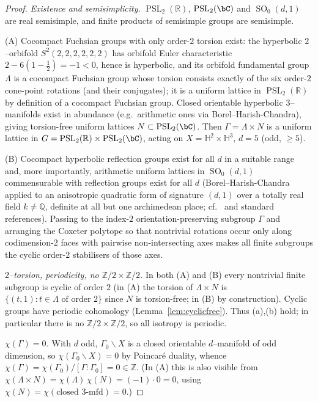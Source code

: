 \documentclass[12pt]{article}
\newcommand{\bR}{\mathbb{R}}
\newcommand{\bQ}{\mathbb{Q}}
\newcommand{\bZ}{\mathbb{Z}}
\newcommand{\bH}{\mathbb{H}}
\DeclareMathOperator{\SO}{SO}
\DeclareMathOperator{\PSL}{PSL}
\theoremstyle{definition}
\begin{document}
\begin{proof}
\emph{Existence and semisimplicity.}  $\PSL_2(\bR)$, $\PSL_2(\bC)$ and
$\SO_0(d,1)$ are real semisimple, and finite products of semisimple groups are
semisimple.

(A) Cocompact Fuchsian groups with only order-$2$ torsion exist: the hyperbolic
$2$--orbifold $S^2(2,2,2,2,2,2)$ has orbifold Euler characteristic
$2-6(1-\tfrac12)=-1<0$, hence is hyperbolic, and its orbifold fundamental group
$\Lambda$ is a cocompact Fuchsian group whose torsion consists exactly of the six
order-$2$ cone-point rotations (and their conjugates); it is a uniform lattice in
$\PSL_2(\bR)$ by definition of a cocompact Fuchsian group.  Closed orientable
hyperbolic $3$--manifolds exist in abundance (e.g.\ arithmetic ones via
Borel--Harish-Chandra), giving torsion-free uniform lattices
$N\subset\PSL_2(\bC)$.  Then $\Gamma=\Lambda\times N$ is a uniform lattice in
$G=\PSL_2(\bR)\times\PSL_2(\bC)$, acting on $X=\bH^2\times\bH^3$, $d=5$ (odd,
$\ge5$).

(B) Cocompact hyperbolic reflection groups exist for all $d$ in a suitable range
and, more importantly, arithmetic uniform lattices in $\SO_0(d,1)$ commensurable
with reflection groups exist for all $d$ (Borel--Harish-Chandra applied to an
anisotropic quadratic form of signature $(d,1)$ over a totally real field $k\neq
\bQ$, definite at all but one archimedean place; cf.\ \cite[\S2]{Lueck} and
standard references).  Passing to the index-$2$ orientation-preserving subgroup
$\Gamma$ and arranging the Coxeter polytope so that nontrivial rotations occur
only along codimension-$2$ faces with pairwise non-intersecting axes makes all
finite subgroups the cyclic order-$2$ stabilisers of those axes.

\emph{$2$--torsion, periodicity, no $\bZ/2\times\bZ/2$.}  In both (A) and (B)
every nontrivial finite subgroup is cyclic of order $2$ (in (A) the torsion of
$\Lambda\times N$ is $\{(t,1):t\in\Lambda\text{ of order }2\}$ since $N$ is
torsion-free; in (B) by construction).  Cyclic groups have periodic cohomology
(Lemma~\ref{lem:cyclicfree}).  Thus (a),(b) hold; in particular there is no
$\bZ/2\times\bZ/2$, so all isotropy is periodic.

\emph{$\chi(\Gamma)=0$.}  With $d$ odd, $\Gamma_0\backslash X$ is a closed
orientable $d$--manifold of odd dimension, so $\chi(\Gamma_0\backslash X)=0$ by
Poincar\'e duality, whence
$\chi(\Gamma)=\chi(\Gamma_0)/[\Gamma:\Gamma_0]=0\in\bZ$.  (In (A) this is also
visible from $\chi(\Lambda\times N)=\chi(\Lambda)\,\chi(N)=(-1)\cdot0=0$, using
$\chi(N)=\chi(\text{closed }3\text{-mfd})=0$.)


\end{proof}
\end{document}

